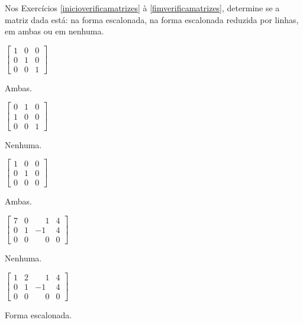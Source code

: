 \documentclass[12pt]{exam}
\begin{document}
Nos Exercícios \ref{inicioverificamatrizes} à \ref{fimverificamatrizes}, determine se a matriz dada está: na forma escalonada, na forma escalonada reduzida por linhas, em ambas ou em nenhuma.

\begin{multicols}{2}
    \begin{exercicio}\label{inicioverificamatrizes}
        $\begin{bmatrix}1 & 0 & 0\\0 & 1 & 0\\0 & 0 & 1\end{bmatrix}$
        \begin{solucao}
            Ambas.
        \end{solucao}
    \end{exercicio}

        \begin{exercicio}
        $\begin{bmatrix}0 & 1 & 0\\1 & 0 & 0\\0 & 0 & 1\end{bmatrix}$
        \begin{solucao}
            Nenhuma.
        \end{solucao}
    \end{exercicio}

    \begin{exercicio}
        $\begin{bmatrix}1 & 0 & 0\\0 & 1 & 0\\0 & 0 & 0\end{bmatrix}$
        \begin{solucao}
            Ambas.
        \end{solucao}
    \end{exercicio}

    \begin{exercicio}
        $\begin{bmatrix}7 & 0 & \phantom{-} 1 & 4\\0 & 1 & -1 & 4\\0 & 0 & \phantom{-} 0 & 0\end{bmatrix}$
        \begin{solucao}
            Nenhuma.
        \end{solucao}
    \end{exercicio}

        \begin{exercicio}
        $\begin{bmatrix}1 & 2 & \phantom{-} 1 & 4\\0 & 1 & -1 & 4\\0 & 0 & \phantom{-} 0 & 0\end{bmatrix}$
        \begin{solucao}
            Forma escalonada.
        \end{solucao}
    \end{exercicio}


\end{multicols}
\end{document}
